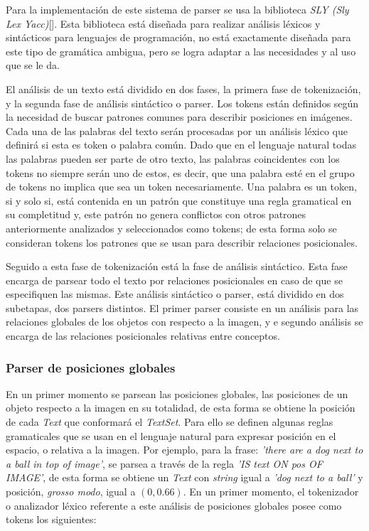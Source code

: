 Para la implementación de este sistema de parser se usa la biblioteca \textit{SLY (Sly Lex Yacc)}[\cite{sly}]. Esta biblioteca está diseñada para realizar análisis léxicos y sintácticos para lenguajes de programación, no está exactamente diseñada para este tipo de gramática ambigua, pero se logra adaptar a las necesidades y al uso que se le da.

El análisis de un texto está dividido en dos fases, la primera fase de tokenización, y la segunda fase de análisis sintáctico o parser. Los tokens están definidos según la necesidad de buscar patrones comunes para describir posiciones en imágenes. Cada una de las palabras del texto serán procesadas por un análisis léxico que definirá si esta es token o palabra común. Dado que en el lenguaje natural todas las palabras pueden ser parte de otro texto, las palabras coincidentes con los tokens no siempre serán uno de estos, es decir, que una palabra esté en el grupo de tokens no implica que sea un token necesariamente. Una palabra es un token, si y solo si, está contenida en un patrón que constituye una regla gramatical en su completitud y, este patr\'on no genera conflictos con otros patrones anteriormente analizados y seleccionados como tokens; de esta forma solo se consideran tokens los patrones que se usan para describir relaciones posicionales. 

Seguido a esta fase de tokenización est\'a la fase de análisis sintáctico. Esta fase encarga de parsear todo el texto por relaciones posicionales en caso de que se especifiquen las mismas. Este análisis sint\'actico o parser, está dividido en dos subetapas, dos parsers distintos. El primer parser consiste en un análisis para las relaciones globales de los objetos con respecto a la imagen, y e segundo análisis se encarga de las relaciones posicionales relativas entre conceptos.

\subsubsection{Parser de posiciones globales}

En un primer momento se parsean las posiciones globales, las posiciones de un objeto respecto a la imagen en su totalidad, de esta forma se obtiene la posición de cada \textit{Text} que conformará el \textit{TextSet}. Para ello se definen algunas reglas gramaticales que se usan en el lenguaje natural para expresar posición en el espacio, o relativa a la imagen. Por ejemplo, para la frase: \textit{'there are a dog next to a ball in top of image'}, se parsea a través de la regla \textit{'IS text ON pos OF IMAGE'}, de esta forma se obtiene un \textit{Text} con \textit{string} igual a \textit{'dog next to a ball'} y posici\'on, \textit{grosso modo}, igual a $(0, 0.66)$. En un primer momento, el tokenizador o analizador léxico referente a este análisis de posiciones globales posee como tokens los siguientes:

